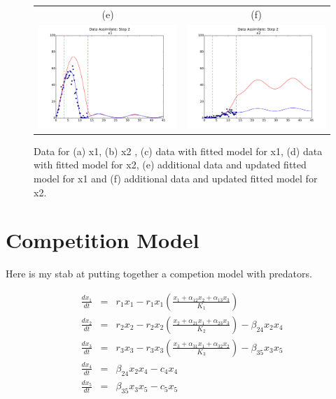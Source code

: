 \documentclass[11pt,twoside]{article}
\numberwithin{equation}{section}
\begin{document}
\begin{figure}[ht!]
\begin{center}
\begin{tabular}{c c}
    (e) & (f) \\
    \includegraphics[width=3in]{DSStep2x1.pdf} &
    \includegraphics[width=3in]{DSStep2x2.pdf} \\
      \end{tabular}
  \end{center}\caption{ Data for (a) x1, (b) x2 , (c) data with fitted model for x1, (d) data with fitted model for x2, (e) additional data and updated fitted model for x1 and (f) additional data and updated fitted model for x2.}\label{fig:Example1}
\end{figure}

\section{Competition Model}
\label{sect-competition}

Here is my stab at putting together a competion model with predators.

\begin{eqnarray*}
\frac{d x_1}{dt} &=& r_1 x_1 - r_1 x_1 \left( \frac{ x_1 + \alpha_{12} x_2 + \alpha_{13} x_3}{K_1} \right)  \\
\frac{d x_2}{dt} &=& r_2 x_2 - r_2 x_2 \left( \frac{ x_2 + \alpha_{21} x_1 + \alpha_{23} x_3}{K_2} \right) - \beta_{24} x_2 x_4  \\
\frac{d x_3}{dt} &=& r_3 x_3 - r_3 x_3 \left( \frac{ x_3 + \alpha_{31} x_1 + \alpha_{32} x_2}{K_3} \right) - \beta_{35} x_3 x_5   \\
\frac{d x_4}{dt} &=& \beta_{24} x_2 x_4  - c_4 x_4 \\
\frac{d x_5}{dt} &=& \beta_{35} x_3 x_5  - c_5 x_5 \\
\end{eqnarray*}
\end{document}

